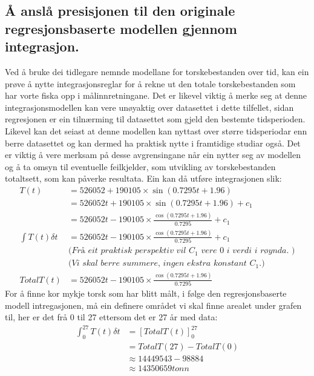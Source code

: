 \documentclass{report}
\begin{document}
\subsection{Å anslå presisjonen til den originale regresjonsbaserte modellen gjennom integrasjon.}
Ved å bruke dei tidlegare nemnde modellane for torskebestanden over tid, kan ein prøve å nytte integrasjonsreglar for å rekne ut den totale torskebestanden som har vorte fiska opp i målinnretningane.
Det er likevel viktig å merke seg at denne integrasjonsmodellen kan vere unøyaktig over datasettet i dette tilfellet, sidan regresjonen er ein tilnærming til datasettet som gjeld den bestemte tidsperioden.
Likevel kan det seiast at denne modellen kan nyttast over større tidsperiodar enn berre datasettet og kan dermed ha praktisk nytte i framtidige studiar også.
Det er viktig å vere merksam på desse avgrensingane når ein nytter seg av modellen og å ta omsyn til eventuelle feilkjelder, som utvikling av torskebestanden totaltsett, som kan påverke resultata.
Ein kan då utføre integrasjonen slik:
\begin{align*}
	T(t)              & = 526052+190105\times \sin(0.7295t+1.96)                                  \\
	                  & = 526052t+190105\times\sin(0.7295t+1.96)+c_{1}                            \\
	                  & = 526052t-190105\times\frac{\cos(0.7295t+1.96)}{0.7295}+c_{1}             \\
	\int T(t)\delta t & =526052t-190105\times\frac{\cos(0.7295t+1.96)}{0.7295}+c_{1}              \\
	                  & \textit{(Frå eit praktisk perspektiv vil $C_1$ vere 0 i verdi i røynda. )} \\
					  & \textit{(Vi skal berre summere, ingen ekstra konstant $C_1$.)} \\
	TotalT(t)         & =526052t-190105\times\frac{\cos(0.7295t+1.96)}{0.7295}
\end{align*}
For å finne kor mykje torsk som har blitt målt, i følge den regresjonsbaserte modell intregasjonen, må ein definere området vi skal finne arealet under grafen til, her er det frå 0 til 27 ettersom det er 27 år med data:
\begin{align*}
	\int_{0}^{27}T(t) \delta t & = [TotalT(t)]_{0}^{27} \\
	                           & = TotalT(27)-TotalT(0) \\
	                           & \approx 14449543-98884 \\
	                           & \approx 14350659tonn
\end{align*}
\end{document}
